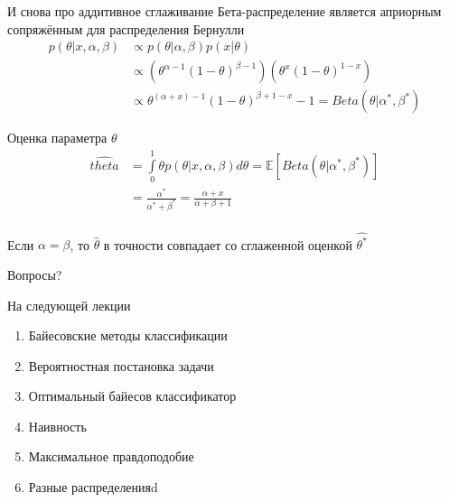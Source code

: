 \documentclass[10pt]{beamer}
\begin{document}
\begin{frame}{И снова про аддитивное сглаживание}
  Бета-распределение является априорным сопряжённым для распределения Бернулли\\  
  \begin{equation*}
    \begin{split}
    p(\theta | x, \alpha, \beta) & \propto p(\theta|\alpha, \beta) p(x|\theta) \\
      & \propto (\theta^{\alpha-1} (1-\theta)^{\beta-1})(\theta^x (1-\theta)^{1-x}) \\
      & \propto \theta^{(\alpha+x)-1} (1-\theta)^{\beta+1-x}-1 = Beta(\theta| \alpha^*, \beta^*)
    \end{split}
  \end{equation*}
\end{frame}

\begin{frame}{Оценка параметра $\theta$}
  \begin{equation*}
    \begin{split}
      \hat{theta} &= \int\limits_{0}^1 \theta p(\theta|x, \alpha, \beta) d\theta  = \mathbb{E} [Beta(\theta|\alpha^*, \beta^*)]\\
      & = \frac{\alpha^*}{\alpha^*+\beta^*} = \frac{\alpha+x}{\alpha + \beta + 1}
    \end{split}
  \end{equation*}\\
  Если $\alpha = \beta$, то $\hat{\theta}$ в точности совпадает со сглаженной оценкой $\hat{\theta^*}$
  
\end{frame}

\begin{frame}[standout]
  Вопросы?
\end{frame}

\appendix

\begin{frame}{На следующей лекции}
  	\begin{enumerate} [--]
		\item Байесовские методы классификации
		\item Вероятностная постановка задачи
		\item Оптимальный байесов классификатор
		\item Наивность
		\item Максимальное правдоподобие
		\item Разные распределенияd
	\end{enumerate}
\end{frame}
\end{document}

